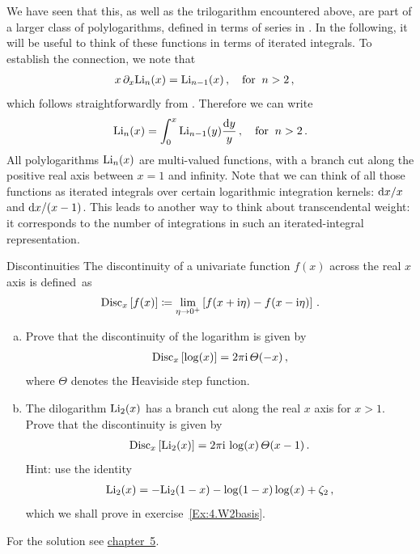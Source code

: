 We have seen that this, as well as the trilogarithm encountered above, are part of a larger class of polylogarithms, defined in terms of series in .
 In the following, it will be useful to think of these functions in terms of iterated integrals.
 To establish the connection, we note that 
\begin{align}
x \, \partial_x {\rm Li}_{n}(x) &=  {\rm Li}_{n-1}(x) \,,\quad {\rm for} \;\; n>2 \,,
\end{align}
which follows straightforwardly from . 
Therefore we can write
\begin{align}
 {\rm Li}_{n}(x) = \int_0^x  {\rm Li}_{n-1}(y) \frac{\mathrm{d} y}{y}  \,,\quad {\rm for} \;\; n>2 \,.
\end{align}
All polylogarithms ${\rm Li}_{n}(x)$ are multi-valued functions, with a branch cut along the positive real axis between $x=1$ and infinity.
Note that we can think of all those functions as iterated integrals over certain logarithmic integration kernels: $\mathrm{d} x/x$ and $\mathrm{d} x/(x-1)$.
This leads to another way to think about transcendental weight: it corresponds to the number of integrations in such an iterated-integral representation.



\begin{exer}{Discontinuities}
\label{Ex:Discontinuities}
The discontinuity of a univariate function $f(x)$ across the real $x$ axis is defined~as
\begin{align}
\mathrm{Disc}_x \left[f(x)\right] \coloneqq \lim_{\eta\to 0^+} \left[ f(x+\mathrm{i} \eta) - f(x- \mathrm{i} \eta) \right] \,.
\end{align}
\begin{enumerate}[a)]
\item Prove that the discontinuity of the logarithm is given by
\begin{align} \label{eq:disc_log}
\mathrm{Disc}_x \left[\log(x)\right] = 2 \pi \i \, \Theta(-x) \,,
\end{align}
where $\Theta$ denotes the Heaviside step function. 

\smallskip
\item The dilogarithm ${\rm Li}_2(x)$ has a branch cut along the real $x$ axis for $x>1$. Prove that the discontinuity is given by
\begin{align} \label{eq:disc_dilog}
\mathrm{Disc}_x \left[\text{Li}_2(x)\right] = 2 \pi \i \, \log(x) \, \Theta(x-1) \,.
\end{align}
Hint: use the identity
\begin{align} \label{eq:Li2identity}
{\rm Li}_2(x) = - {\rm Li}_2(1-x) - \log(1-x) \log(x) + \zeta_2 \,,
\end{align}
which we shall prove in exercise~\ref{Ex:4.W2basis}.

\end{enumerate}
For the solution see \hyperref[Sol:Discontinuities]{chapter~5}.
\end{exer}




